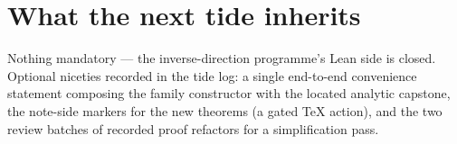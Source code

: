 \documentclass[11pt]{article}
\begin{document}
\section{What the next tide inherits}

Nothing mandatory --- the inverse-direction programme's Lean side is
closed. Optional niceties recorded in the tide log: a single
end-to-end convenience statement composing the family constructor
with the located analytic capstone, the note-side markers for the
new theorems (a gated TeX action), and the two review batches of
recorded proof refactors for a simplification pass.
\end{document}
